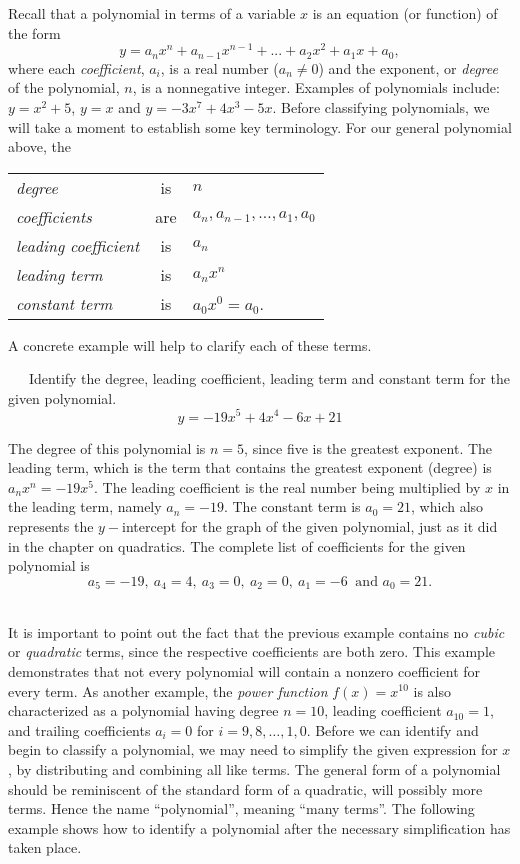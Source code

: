 {}\pp

Recall that a polynomial in terms of a variable $x$ is an equation (or function) of the form
$$y = a_{n}x^{n} + a_{n-1}x^{n-1}+ ... + a_{2}x^2 + a_{1}x + a_{0},$$
where each \textit{coefficient}, $a_{i}$, is a real number ($a_n\neq 0$) and the exponent, or \textit{degree} of the polynomial, $n$, is a nonnegative integer.\pp
Examples of polynomials include: $y = x^2 + 5$, $y=x$ and $y = -3x^7+4x^3-5x$.  Before classifying polynomials, we will take a moment to establish some key terminology. For our general polynomial above, the
\begin{center}
\begin{tabular}{lcl}
\textit{degree} & is & $n$\\
\textit{coefficients} & are & $a_n,a_{n-1},\ldots,a_1,a_0$\\
\textit{leading coefficient} & is & $a_n$\\
\textit{leading term} & is & $a_nx^n$\\
\textit{constant term} & is & $a_0x^0=a_0$.
\end{tabular}
\end{center}

A concrete example will help to clarify each of these terms.

\newpage

\begin{example}~~~Identify the degree, leading coefficient, leading term and constant term for the given polynomial.
$$y = -19x^5+4x^4-6x+21$$

The degree of this polynomial is $n=5$, since five is the greatest exponent.\pp
The leading term, which is the term that contains the greatest exponent (degree) is $a_nx^n=-19x^5$.\pp
The leading coefficient is the real number being multiplied by $x$ in the leading term, namely $a_n=-19$.\pp
The constant term is $a_0=21$, which also represents the $y-$intercept for the graph of the given polynomial, just as it did in the chapter on quadratics.\pp
The complete list of coefficients for the given polynomial is
$$a_5=-19,~ a_4=4,~ a_3=0,~ a_2=0,~ a_1=-6~ \text{~and~} a_0=21.$$
\end{example}
~\\
It is important to point out the fact that the previous example contains no \textit{cubic} or \textit{quadratic} terms, since the respective coefficients are both zero.  This example demonstrates that not every polynomial will contain a nonzero coefficient for every term.  As another example, the \textit{power function} \mbox{$f(x)=x^{10}$} is also characterized as a polynomial having degree $n=10$, leading coefficient $a_{10}=1$, and trailing coefficients $a_i=0$ for $i=9,8,\ldots,1,0$.\pp
Before we can identify and begin to classify a polynomial, we may need to simplify the given expression for $x$, by distributing and combining all like terms.  The general form of a polynomial should be reminiscent of the standard form of a quadratic, will possibly more terms.  Hence the name ``polynomial'', meaning ``many terms''.\pp
The following example shows how to identify a polynomial after the necessary simplification has taken place.

